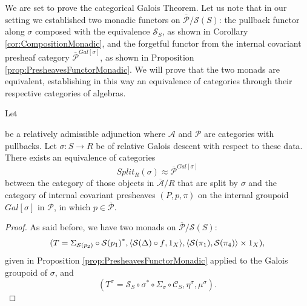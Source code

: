 We are set to prove the categorical Galois Theorem. Let us note that in our setting we established two monadic functors on $\overline{\mathcal{P}}/\mathcal{S}(S)$: the pullback functor along $\sigma$ composed with the equivalence $\mathcal{S}_S$, as shown in Corollary \ref{cor:CompositionMonadic}, and the forgetful functor from the internal covariant presheaf category $\overline{\mathcal{P}}^{Gal[\sigma]}$, as shown in Proposition \ref{prop:PresheavesFunctorMonadic}. We will prove that the two monads are equivalent, establishing in this way an equivalence of categories through their respective categories of algebras.
\begin{theorem}
\label{thm:CategoricalGaloisTheorem}
    Let
    be a relatively admissible adjunction where $\mathcal{A}$ and $\mathcal{P}$ are categories with pullbacks. Let $\sigma:S\to R$ be of relative Galois descent with respect to these data. There exists an equivalence of categories
    \[ Split_R(\sigma)\approx\overline{\mathcal{P}}^{Gal[\sigma]} \]
    between the category of those objects in $\overline{\mathcal{A}}/R$ that are split by $\sigma$ and the category of internal covariant presheaves $(P,p,\pi)$ on the internal groupoid $Gal[\sigma]$ in $\mathcal{P}$, in which $p\in\overline{\mathcal{P}}$.
    \begin{proof}

        As said before, we have two monads on $\overline{\mathcal{P}}/\mathcal{S}(S)$: 
        \[ (T = \Sigma_{\mathcal{S}(p_2)}\circ{\mathcal{S}(p_1)}^*, \langle{\mathcal{S}(\Delta)\circ f},{1_X}\rangle, \langle{\mathcal{S}(\pi_1)},{\mathcal{S}(\pi_4)}\rangle\times 1_X), \]
        given in Proposition \ref{prop:PresheavesFunctorMonadic} applied to the Galois groupoid of $\sigma$, and 
        \[ (T^\sigma = \mathcal{S}_S\circ\sigma^*\circ\Sigma_\sigma\circ\mathcal{C}_S, \eta^\sigma, \mu^\sigma). \] 
        

\end{proof}
\end{theorem}
